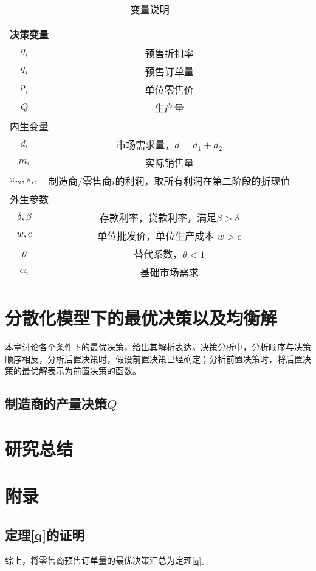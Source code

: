 \documentclass[12pt]{article} %
\numberwithin{equation}{section} %
\begin{document}
\begin{table}[H]
	\centering
	\caption{变量说明}
\begin{tabular}{|c|c|}
	\hline
	\multicolumn{2}{|l|}{决策变量}\\\hline %
	$\eta_i$ & 预售折扣率  \\
	\hline
	$q_i$ & 预售订单量  \\
	\hline
	$p_i$ & 单位零售价  \\
	\hline
	$Q$ & 生产量  \\
	\hline
	\multicolumn{2}{|l|}{内生变量}\\\hline
	$d_i$ & 市场需求量，$d=d_1+d_2$  \\
	\hline
	$m_i$ & 实际销售量  \\
	\hline
	$\pi_m,\pi_i,$ & 制造商/零售商$i$的利润，取所有利润在第二阶段的折现值  \\
	\hline
	\multicolumn{2}{|l|}{外生参数}\\\hline
	$\delta,\beta$ & 存款利率，贷款利率，满足$\beta>\delta$ \\
	\hline
	$w,c$ & 单位批发价，单位生产成本 $w>c$ \\
	\hline
	$\theta$ & 替代系数，$\theta<1$ \\
	\hline
	$\alpha_i$ & 基础市场需求 \\
	\hline
\end{tabular}
\end{table}



\clearpage


\section{分散化模型下的最优决策以及均衡解}
本章讨论各个条件下的最优决策，给出其解析表达。决策分析中，分析顺序与决策顺序相反，分析后置决策时，假设前置决策已经确定；分析前置决策时，将后置决策的最优解表示为前置决策的函数。
\subsection{制造商的产量决策$Q$}

\clearpage

\section{研究总结}

\clearpage
\section{附录}

\subsection{定理\ref{q}的证明}


综上，将零售商预售订单量的最优决策汇总为定理\ref{q}。

\clearpage
{}
{}

\nocite{*}%

\end{document}
